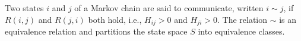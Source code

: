 Two states $i$ and $j$ of a Markov chain are said to communicate, written $i \sim j$, if $R(i,j)$ and $R(j,i)$ both hold, i.e., $H_{ij} > 0$ and $H_{ji} > 0$. The relation $\sim$ is an equivalence relation and partitions the state space $S$ into equivalence classes.
